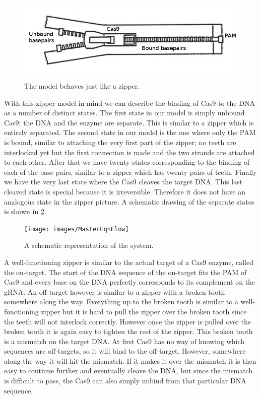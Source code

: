 \begin{figure}[H]
\begin{center}
\includegraphics[width=\textwidth]{images/zipper2}
\caption{The model behaves just like a zipper.}
\label{fig:zipper}
\end{center}
\end{figure}

With this zipper model in mind we can describe the binding of Cas9 to the DNA as a number of distinct states. The first state in our model is simply unbound Cas9; the DNA and the enzyme are separate. This is similar to a zipper which is entirely separated. The second state in our model is the one where only the PAM is bound, similar to attaching the very first part of the zipper; no teeth are interlocked yet but the first connection is made and the two strands are attached to each other. %
After that we have twenty states corresponding to the binding of each of the base pairs, similar to a zipper which has twenty pairs of teeth. Finally we have the very last state where the Cas9 cleaves the target DNA. This last cleaved state is special because it is irreversible. Therefore it does not have an analogous state in the zipper picture. A schematic drawing of the separate states is shown in \ref{fig:mastereqn_schematic1}.


\begin{figure}[H]
\begin{center}
\texttt{[image: images/MasterEqnFlow]}
\label{fig:mastereqn_schematic1}
\caption{A schematic representation of the system.}
\end{center}
\end{figure}


A well-functioning zipper is similar to the actual target of a Cas9 enzyme, called the on-target. The start of the DNA sequence of the on-target fits the PAM of Cas9 and every base on the DNA perfectly corresponds to its complement on the gRNA. An off-target however is similar to a zipper with a broken tooth somewhere along the way. Everything up to the broken tooth is similar to a well-functioning zipper but it is hard to pull the zipper over the broken tooth since the teeth will not interlock correctly. However once the zipper is pulled over the broken tooth it is again easy to tighten the rest of the zipper. This broken tooth is a mismatch on the target DNA. At first Cas9 has no way of knowing which sequences are off-targets, so it will bind to the off-target. However, somewhere along the way it will hit the mismatch. If it makes it over the mismatch it is then easy to continue further and eventually cleave the DNA, but since the mismatch is difficult to pass, the Cas9 can also simply unbind from that particular DNA sequence.

